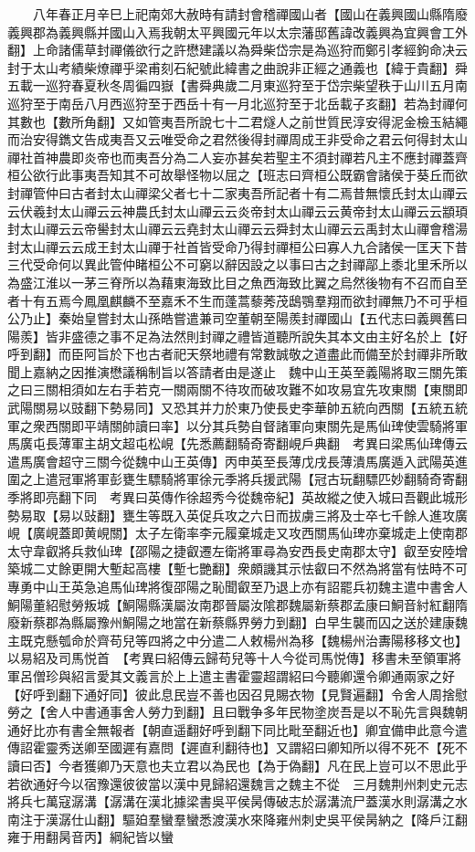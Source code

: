 　　八年春正月辛巳上祀南郊大赦時有請封會稽禪國山者【國山在義興國山縣隋廢義興郡為義興縣并國山入焉我朝太平興國元年以太宗藩邸舊諱改義興為宜興會工外翻】上命諸儒草封禪儀欲行之許懋建議以為舜柴岱宗是為巡狩而鄭引孝經鉤命决云封于太山考績柴燎禪乎梁甫刻石紀號此緯書之曲說非正經之通義也【緯于貴翻】舜五載一巡狩春夏秋冬周徧四嶽【書舜典歲二月東巡狩至于岱宗柴望秩于山川五月南巡狩至于南岳八月西巡狩至于西岳十有一月北巡狩至于北岳載子亥翻】若為封禪何其數也【數所角翻】又如管夷吾所說七十二君燧人之前世質民淳安得泥金檢玉結繩而治安得鐫文告成夷吾又云唯受命之君然後得封禪周成王非受命之君云何得封太山禪社首神農即炎帝也而夷吾分為二人妄亦甚矣若聖主不須封禪若凡主不應封禪蓋齊桓公欲行此事夷吾知其不可故舉怪物以屈之【班志曰齊桓公既霸會諸侯于葵丘而欲封禪管仲曰古者封太山禪梁父者七十二家夷吾所記者十有二焉昔無懷氏封太山禪云云伏羲封太山禪云云神農氏封太山禪云云炎帝封太山禪云云黄帝封太山禪云云顓頊封太山禪云云帝嚳封太山禪云云堯封太山禪云云舜封太山禪云云禹封太山禪會稽湯封太山禪云云成王封太山禪于社首皆受命乃得封禪桓公曰寡人九合諸侯一匡天下昔三代受命何以異此管仲睹桓公不可窮以辭因設之以事曰古之封禪鄗上黍北里禾所以為盛江淮以一茅三脊所以為藉東海致比目之魚西海致比翼之烏然後物有不召而自至者十有五焉今鳳凰麒麟不至嘉禾不生而蓬蒿藜莠茂鴟鶚羣翔而欲封禪無乃不可乎桓公乃止】秦始皇嘗封太山孫皓嘗遣兼司空董朝至陽羨封禪國山【五代志曰義興舊曰陽羨】皆非盛德之事不足為法然則封禪之禮皆道聽所說失其本文由主好名於上【好呼到翻】而臣阿旨於下也古者祀天祭地禮有常數誠敬之道盡此而備至於封禪非所敢聞上嘉納之因推演懋議稱制旨以答請者由是遂止　魏中山王英至義陽將取三關先策之曰三關相須如左右手若克一關兩關不待攻而破攻難不如攻易宜先攻東關【東關即武陽關易以豉翻下勢易同】又恐其并力於東乃使長史李華帥五統向西關【五統五統軍之衆西關即平靖關帥讀曰率】以分其兵勢自督諸軍向東關先是馬仙琕使雲騎將軍馬廣屯長薄軍主胡文超屯松峴【先悉薦翻騎奇寄翻峴戶典翻　考異曰梁馬仙琕傳云遣馬廣會超守三關今從魏中山王英傳】丙申英至長薄戊戌長薄潰馬廣遁入武陽英進圍之上遣冠軍將軍彭甕生驃騎將軍徐元季將兵援武陽【冠古玩翻驃匹妙翻騎奇寄翻季將即亮翻下同　考異曰英傳作徐超秀今從魏帝紀】英故縱之使入城曰吾觀此城形勢易取【易以䜴翻】甕生等既入英促兵攻之六日而拔虜三將及士卒七千餘人進攻廣峴【廣峴蓋即黄峴關】太子左衛率李元履棄城走又攻西關馬仙琕亦棄城走上使南郡太守韋叡將兵救仙琕【邵陽之捷叡遷左衛將軍尋為安西長史南郡太守】叡至安陸增築城二丈餘更開大塹起高樓【塹七艷翻】衆頗譏其示怯叡曰不然為將當有怯時不可專勇中山王英急追馬仙琕將復邵陽之恥聞叡至乃退上亦有詔罷兵初魏主遣中書舍人鮦陽董紹慰勞叛城【鮦陽縣漢屬汝南郡晉屬汝隂郡魏屬新蔡郡孟康曰鮦音紂紅翻隋廢新蔡郡為縣屬豫州鮦陽之地當在新蔡縣界勞力到翻】白早生襲而囚之送於建康魏主既克懸瓠命於齊苟兒等四將之中分遣二人敕楊州為移【魏楊州治夀陽移移文也】以易紹及司馬悦首　【考異曰紹傳云歸苟兒等十人今從司馬悦傳】移書未至領軍將軍呂僧珍與紹言愛其文義言於上上遣主書霍靈超謂紹曰今聽卿還令卿通兩家之好【好呼到翻下通好同】彼此息民豈不善也因召見賜衣物【見賢遍翻】令舍人周捨慰勞之【舍人中書通事舍人勞力到翻】且曰戰争多年民物塗炭吾是以不恥先言與魏朝通好比亦有書全無報者【朝直遥翻好呼到翻下同比毗至翻近也】卿宜備申此意今遣傳詔霍靈秀送卿至國遲有嘉問【遲直利翻待也】又謂紹曰卿知所以得不死不【死不讀曰否】今者獲卿乃天意也夫立君以為民也【為于偽翻】凡在民上豈可以不思此乎若欲通好今以宿豫還彼彼當以漢中見歸紹還魏言之魏主不從　三月魏荆州刺史元志將兵七萬寇潺溝【潺溝在漢北據梁書吳平侯昺傳破志於潺溝流尸蓋漢水則潺溝之水南注于漢潺仕山翻】驅廹羣蠻羣蠻悉渡漢水來降雍州刺史吳平侯昺納之【降戶江翻雍于用翻昺音丙】綱紀皆以蠻